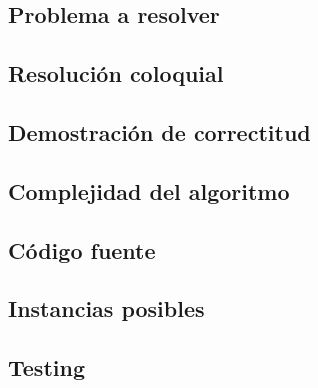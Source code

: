\subsection{Problema a resolver}


\subsection{Resolución coloquial}


\subsection{Demostración de correctitud}

\subsection{Complejidad del algoritmo}

\subsection{Código fuente}



\subsection{Instancias posibles}



\subsection{Testing}